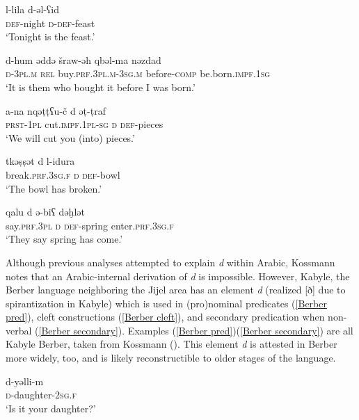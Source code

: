 \documentclass[output=paper]{langsci/langscibook}
\begin{document}
\ea\label{nonverbal}

\gll l-lila  d-ǝl-ʕid\\
     \textsc{def}-night  \textsc{d}-\textsc{def}-feast\\
\glt ‘Tonight is the feast.’
\z

\ea\label{clefts}

\gll d-hum  ǝddǝ  šraw-ǝh   qbǝl-ma  nǝzdad\\
     \textsc{d}-\textsc{3pl.m} \textsc{rel}  buy.\textsc{prf.3pl.m}-\textsc{3sg.m}  before-\textsc{comp} be.born.\textsc{impf.1sg}\\
\glt ‘It is them who bought it before I was born.’
\z

\ea\label{secondary pred}

\gll {\R}a-na  nqǝṭṭʕu-č  d  ǝṭ-ṭraf\\
     \textsc{prst}-\textsc{1pl}  cut.\textsc{impf.1pl-sg}  \textsc{d}  \textsc{def}-pieces\\
\glt ‘We will cut you (into) pieces.’
\z

\ea\label{focus}

\gll tkǝṣṣ{\R}ǝt  d  l-idura\\
     break.\textsc{prf.3sg.f}  \textsc{d}  \textsc{def}-bowl\\
\glt ‘The bowl has broken.’
\z

\ea\label{left focalizations}

\gll qalu  d  ǝ{\R}-{\R}biʕ  dǝḫlǝt\\
     say.\textsc{prf.3pl}  \textsc{d}  \textsc{def}-spring  enter.\textsc{prf.3sg.f}\\
\glt ‘They say spring has come.’
\z

Although previous analyses attempted to explain \textit{d} within Arabic, Kossmann notes that an Arabic-internal derivation of \textit{d} is impossible. However, Kabyle, the Berber language neighboring the Jijel area has an element \textit{d} (realized [ð] due to spirantization in Kabyle) which is used in (pro)nominal predicates (\ref{Berber pred}), cleft constructions (\ref{Berber cleft}), and secondary predication when non-verbal (\ref{Berber secondary}). Examples (\ref{Berber pred})\textendash(\ref{Berber secondary}) are all Kabyle Berber, taken from Kossmann (\citeyear[135]{Kossmann2014}). This element \textit{d} is attested in Berber more widely, too, and is likely reconstructible to older stages of the language.

\ea\label{Berber pred}


\gll d-yǝlli-m\\
     \textsc{d}-daughter-\textsc{2sg.f}\\
\glt ‘Is it your daughter?’
\z
\end{document}
